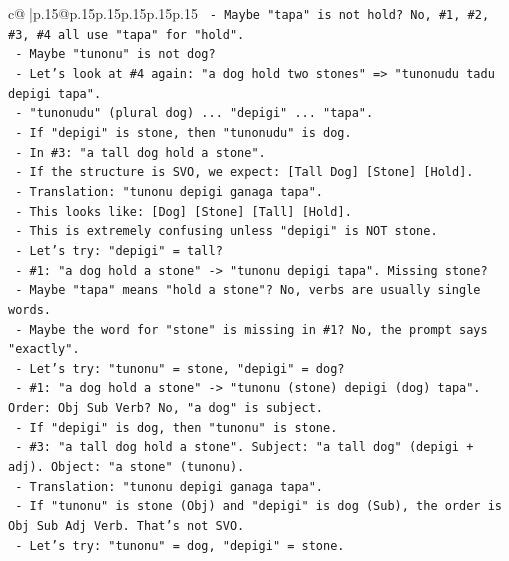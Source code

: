 \documentclass{article}
\begin{document}
{\begin{supertabular}{c@{$\;$}|p{.15\linewidth}@{}p{.15\linewidth}p{.15\linewidth}p{.15\linewidth}p{.15\linewidth}p{.15\linewidth}}
{{{\texttt{        {-} Maybe "tapa" is not hold? No, \#1, \#2, \#3, \#4 all use "tapa" for "hold".} \\
\texttt{        {-} Maybe "tunonu" is not dog?} \\
\texttt{        {-} Let's look at \#4 again: "a dog hold two stones" => "tunonudu tadu depigi tapa".} \\
\texttt{        {-} "tunonudu" (plural dog) ... "depigi" ... "tapa".} \\
\texttt{        {-} If "depigi" is stone, then "tunonudu" is dog.} \\
\texttt{        {-} In \#3: "a tall dog hold a stone".} \\
\texttt{        {-} If the structure is SVO, we expect: {[}Tall Dog{]} {[}Stone{]} {[}Hold{]}.} \\
\texttt{        {-} Translation: "tunonu depigi ganaga tapa".} \\
\texttt{        {-} This looks like: {[}Dog{]} {[}Stone{]} {[}Tall{]} {[}Hold{]}.} \\
\texttt{        {-} This is extremely confusing unless "depigi" is NOT stone.} \\
\texttt{        {-} Let's try: "depigi" = tall?} \\
\texttt{          {-} \#1: "a dog hold a stone" {-}> "tunonu depigi tapa". Missing stone?} \\
\texttt{          {-} Maybe "tapa" means "hold a stone"? No, verbs are usually single words.} \\
\texttt{          {-} Maybe the word for "stone" is missing in \#1? No, the prompt says "exactly".} \\
\texttt{        {-} Let's try: "tunonu" = stone, "depigi" = dog?} \\
\texttt{          {-} \#1: "a dog hold a stone" {-}> "tunonu (stone) depigi (dog) tapa". Order: Obj Sub Verb? No, "a dog" is subject.} \\
\texttt{          {-} If "depigi" is dog, then "tunonu" is stone.} \\
\texttt{          {-} \#3: "a tall dog hold a stone". Subject: "a tall dog" (depigi + adj). Object: "a stone" (tunonu).} \\
\texttt{          {-} Translation: "tunonu depigi ganaga tapa".} \\
\texttt{          {-} If "tunonu" is stone (Obj) and "depigi" is dog (Sub), the order is Obj Sub Adj Verb. That's not SVO.} \\
\texttt{        {-} Let's try: "tunonu" = dog, "depigi" = stone.} \\
}}}
\end{supertabular}}
\end{document}
